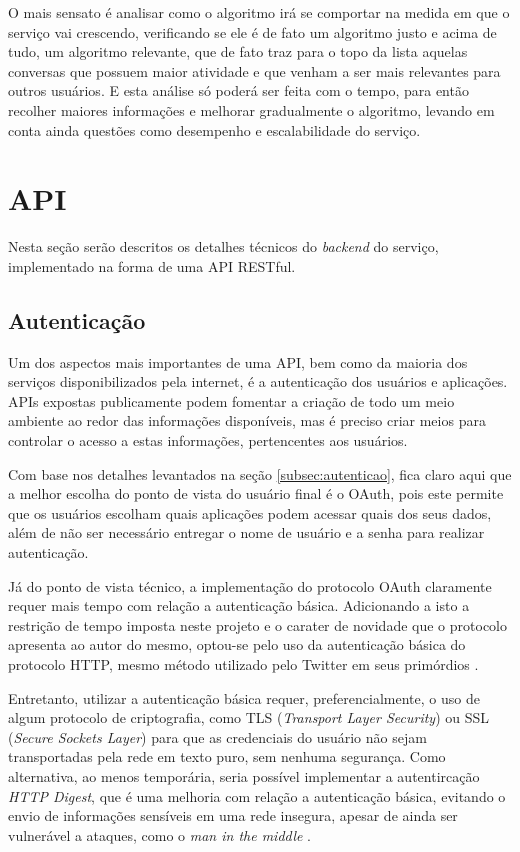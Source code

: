 \documentclass[diss]{template/setrem}
\begin{document}
O mais sensato é analisar como o algoritmo irá se comportar na medida em que o serviço vai crescendo, verificando se ele é de fato um algoritmo justo e acima de tudo, um algoritmo relevante, que de fato traz para o topo da lista aquelas conversas que possuem maior atividade e que venham a ser mais relevantes para outros usuários. E esta análise só poderá ser feita com o tempo, para então recolher maiores informações e melhorar gradualmente o algoritmo, levando em conta ainda questões como desempenho e escalabilidade do serviço.

\section{API}
Nesta seção serão descritos os detalhes técnicos do \emph{backend} do serviço, implementado na forma de uma API RESTful.

\subsection{Autenticação}
\label{subsec:api-auth}
Um dos aspectos mais importantes de uma API, bem como da maioria dos serviços disponibilizados pela internet, é a autenticação dos usuários e aplicações. APIs expostas publicamente podem fomentar a criação de todo um meio ambiente ao redor das informações disponíveis, mas é preciso criar meios para controlar o acesso a estas informações, pertencentes aos usuários.

Com base nos detalhes levantados na seção \ref{subsec:autenticao}, fica claro aqui que a melhor escolha do ponto de vista do usuário final é o OAuth, pois este permite que os usuários escolham quais aplicações podem acessar quais dos seus dados, além de não ser necessário entregar o nome de usuário e a senha para realizar autenticação.

Já do ponto de vista técnico, a implementação do protocolo OAuth claramente requer mais tempo com relação a autenticação básica. Adicionando a isto a restrição de tempo imposta neste projeto e o carater de novidade que o protocolo apresenta ao autor do mesmo, optou-se pelo uso da autenticação básica do protocolo HTTP, mesmo método utilizado pelo Twitter em seus primórdios \citep{Twitter2011a}.

Entretanto, utilizar a autenticação básica requer, preferencialmente, o uso de algum protocolo de criptografia, como TLS (\emph{Transport Layer Security}) ou SSL (\emph{Secure Sockets Layer}) para que as credenciais do usuário não sejam transportadas pela rede em texto puro, sem nenhuma segurança. Como alternativa, ao menos temporária, seria possível implementar a autentircação \emph{HTTP Digest}, que é uma melhoria com relação a autenticação básica, evitando o envio de informações sensíveis em uma rede insegura, apesar de ainda ser vulnerável a ataques, como o \emph{man in the middle} \citep{RFC2617}.
\end{document}
